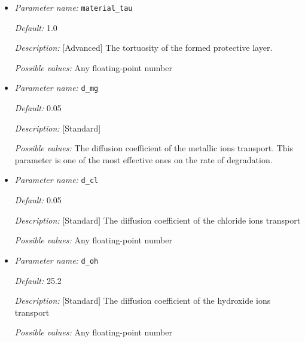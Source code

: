 \begin{itemize}
{\it Default:} 0.55

{\it Description:} [Advanced] The porosity of the formed protective layer in the range [0, 1].

{\it Possible values:} Any floating-point number between 0 and 1


\item {\it Parameter name:} {\tt material\_tau}
\label{parameters:material_tau}


{\it Default:} 1.0

{\it Description:} [Advanced] The tortuosity of the formed protective layer.

{\it Possible values:} Any floating-point number


\item {\it Parameter name:} {\tt d\_mg}
\label{parameters:d_mg}


{\it Default:} 0.05

{\it Description:} [Standard]

{\it Possible values:} The diffusion coefficient of the metallic ions transport. This parameter is one of the most effective ones on the rate of degradation.


\item {\it Parameter name:} {\tt d\_cl}
\label{parameters:d_cl}


{\it Default:} 0.05

{\it Description:} [Standard] The diffusion coefficient of the chloride ions transport

{\it Possible values:} Any floating-point number


\item {\it Parameter name:} {\tt d\_oh}
\label{parameters:d_oh}


{\it Default:} 25.2

{\it Description:} [Standard] The diffusion coefficient of the hydroxide ions transport

{\it Possible values:} Any floating-point number



\end{itemize}
